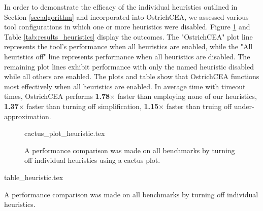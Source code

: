 {%
In order to demonstrate the efficacy of the individual heuristics outlined in Section \ref{sec:algorithm} and incorporated into OstrichCEA, we assessed various tool configurations in which one or more heuristics were disabled. Figure \ref{fig:cactus_heuristics} and Table \ref{tab:results_heuristics} display the outcomes. The "OstrichCEA" plot line represents the tool's performance when all heuristics are enabled, while the "All heuristics off" line represents performance when all heuristics are disabled. The remaining plot lines exhibit performance with only the named heuristic disabled while all others are enabled. The plots and table show that OstrichCEA functions most effectively when all heuristics are enabled. In average time with timeout times, OstrichCEA performs \textbf{1.78}$\times$ faster than employing none of our heuristics, \textbf{1.37}$\times$ faster than turning off simplification, \textbf{1.15}$\times$ faster than truing off under-approximation.
\begin{figure}
  {cactus_plot_heuristic.tex}
  \caption{A performance comparison was made on all benchmarks by turning off individual heuristics using a cactus plot.}
  \label{fig:cactus_heuristics}
\end{figure}
\begin{table}
  {table_heuristic.tex}
  \caption{A performance comparison was made on all benchmarks by turning off individual heuristics.}
  \label{tab:results_heuristics}
\end{table}
}
%